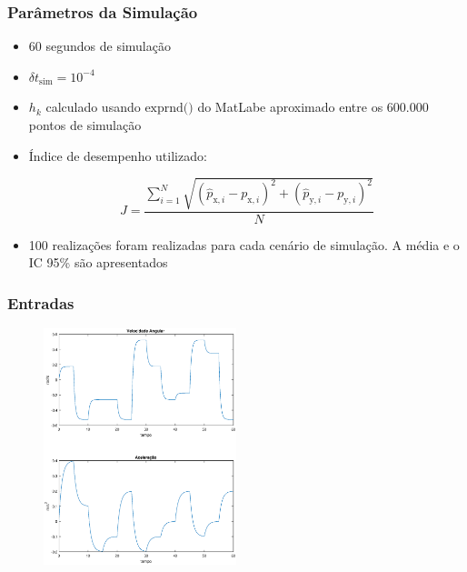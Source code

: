 \documentclass{beamer}
\renewcommand{\(}{\left(}
\renewcommand{\)}{\right)}
\renewcommand{\[}{\left[}
\renewcommand{\]}{\right]}
\begin{document}

\begin{frame}
\frametitle{Parâmetros da Simulação}

\begin{itemize}
	\item 60 segundos de simulação
	\vspace{0.25cm}
	\item $\delta t_{\textrm{sim}} = 10^{-4}$
	\vspace{0.25cm}
	\item $h_k$ calculado usando $\textrm{exprnd()}$ do MatLab\texttrademark e aproximado entre os 600.000 pontos de simulação
		\vspace{0.25cm}
	\item Índice de desempenho utilizado:
	
	\begin{equation*}
	J = \frac{ \sum_{i=1}^N \sqrt{(\hat{p}_{\textrm{x},i}-p_{\textrm{x},i})^2+(\hat{p}_{\textrm{y},i}-p_{\textrm{y},i})^2}}{N}
	\end{equation*}
	\vspace{0.25cm}
	\item 100 realizações foram realizadas para cada cenário de simulação. A média e o IC 95\% são apresentados

	
\end{itemize}

\end{frame}

\begin{frame}
\frametitle{Entradas}

	\begin{figure}
		\centering
		\includegraphics[width=0.5\textwidth]{images/entradas.eps}
	\end{figure}

\end{frame}
\end{document}
